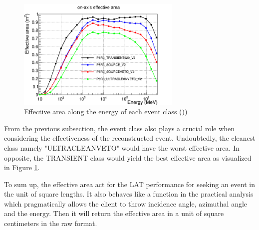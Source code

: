 \begin{figure}[h!]
    \centering
    \includegraphics[width=0.7\textwidth]{content/background/figures/eff_event_class.png}
    \caption{Effective area along the energy of each event class (\cite{lat_p8_performance}))}
    \label{fig:eff_event_class}
\end{figure}


From the previous subsection, the event class also plays a crucial role when considering the effectiveness of the reconstructed event.
Undoubtedly, the cleanest class namely "ULTRACLEANVETO" would have the worst effective area. In opposite, the TRANSIENT class would yield 
the best effective area as visualized in Figure \ref{fig:eff_event_class}.

To sum up, the effective area act for the LAT performance for seeking an event in the unit of square lengths. It also behaves like a function 
in the practical analysis which pragmatically allows the client to 
throw incidence angle, azimuthal angle and the energy. Then it will 
return the effective area in a unit of square centimeters in the raw 
format.